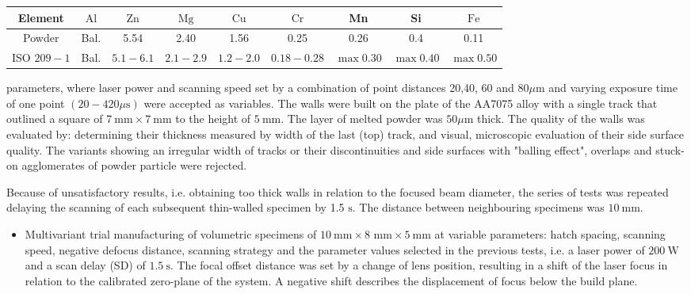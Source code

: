 \documentclass[10pt]{article}
\begin{document}
\begin{center}
\begin{tabular}{|c|c|c|c|c|c|c|c|c|}
\hline
Element & $\mathrm{Al}$ & $\mathrm{Zn}$ & $\mathrm{Mg}$ & $\mathrm{Cu}$ & $\mathrm{Cr}$ & Mn & Si & $\mathrm{Fe}$ \\
\hline
Powder & Bal. & 5.54 & 2.40 & 1.56 & 0.25 & 0.26 & 0.4 & 0.11 \\
\hline
ISO $209-1$ & Bal. & $5.1-6.1$ & $2.1-2.9$ & $1.2-2.0$ & $0.18-0.28$ & $\max 0.30$ & $\max 0.40$ & $\max 0.50$ \\
\hline
\end{tabular}
\end{center}

parameters, where laser power and scanning speed set by a combination of point distances 20,40, 60 and $80 \mu \mathrm{m}$ and varying exposure time of one point $(20-420 \mu \mathrm{s})$ were accepted as variables. The walls were built on the plate of the AA7075 alloy with a single track that outlined a square of $7 \mathrm{~mm} \times 7 \mathrm{~mm}$ to the height of $5 \mathrm{~mm}$. The layer of melted powder was $50 \mu \mathrm{m}$ thick. The quality of the walls was evaluated by: determining their thickness measured by width of the last (top) track, and visual, microscopic evaluation of their side surface quality. The variants showing an irregular width of tracks or their discontinuities and side surfaces with "balling effect", overlaps and stuck-on agglomerates of powder particle were rejected.

Because of unsatisfactory results, i.e. obtaining too thick walls in relation to the focused beam diameter, the series of tests was repeated delaying the scanning of each subsequent thin-walled specimen by 1.5 $\mathrm{s}$. The distance between neighbouring specimens was $10 \mathrm{~mm}$.

\begin{itemize}
  \item Multivariant trial manufacturing of volumetric specimens of $10 \mathrm{~mm} \times 8$ $\mathrm{mm} \times 5 \mathrm{~mm}$ at variable parameters: hatch spacing, scanning speed, negative defocus distance, scanning strategy and the parameter values selected in the previous tests, i.e. a laser power of $200 \mathrm{~W}$ and a scan delay (SD) of $1.5 \mathrm{~s}$. The focal offset distance was set by a change of lens position, resulting in a shift of the laser focus in relation to the calibrated zero-plane of the system. A negative shift describes the displacement of focus below the build plane.
\end{itemize}
\end{document}
